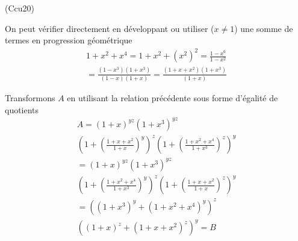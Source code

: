 \begin{tiny}(Ccu20)\end{tiny} On peut vérifier directement en développant ou utiliser ($x\neq 1$) une somme de termes en progression géométrique
\begin{multline*}
  1+x^2+x^4 = 1+x^2+(x^2)^2 = \frac{1-x^6}{1-x^2}\\
  =\frac{(1-x^3)(1+x^3)}{(1-x)(1+x)}
  = \frac{(1+x+x^2)(1+x^3)}{(1+x)}
\end{multline*}

Transformons $A$ en utilisant la relation précédente sous forme d'égalité de quotients
\begin{multline*}
A
= (1+x)^{yz}(1+x^3)^{yz}\\
\left( 1 + \left( \frac{1+x+x^2}{1+x}\right)^y \right)^z 
\left( 1 + \left( \frac{1+x^2+x^4}{1+x^3}\right)^z \right)^y\\
= (1+x)^{yz}(1+x^3)^{yz}\\
\left( 1 + \left( \frac{1+x^2+x^4}{1+x^3}\right)^y \right)^z 
\left( 1 + \left( \frac{1+x+x^2}{1+x}\right)^z \right)^y\\
=
\left( (1+x^3)^y + (1+x^2+x^4)^y \right)^z \\
\left( (1+x)^z + (1+x+x^2)^z \right)^y
= B
\end{multline*}

